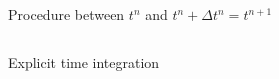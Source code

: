 \begin{frame}{Procedure between $t^n$ and $t^n + \Delta t^n=t^{n+1}$}
\begin{footnotesize}
\begin{columns}
\begin{column}{0.6\textwidth}
\begin{block}{Explicit time integration}
        \end{block}
      \end{column}
    \end{columns}
  \end{footnotesize}
\end{frame}

